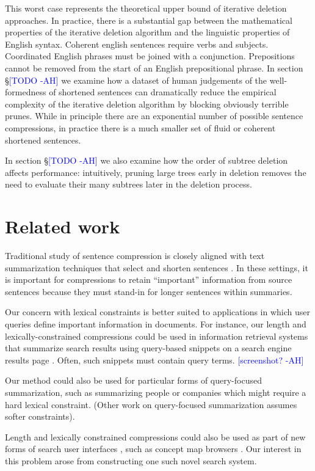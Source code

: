 \documentclass[11pt,a4paper]{article}
\newcommand{\ahcomment}[1]{\textcolor{blue}{[#1 -AH]}}
\begin{document}
This worst case represents the theoretical upper bound of iterative deletion approaches. In practice, there is a substantial gap between the mathematical properties of the iterative deletion algorithm and the linguistic properties of English syntax. Coherent english sentences require verbs and subjects. Coordinated English phrases must be joined with a conjunction. Prepositions cannot be removed from the start of an English prepositional phrase. In section \S\ahcomment{TODO} we examine how a dataset of human judgements of the well-formedness of shortened sentences can dramatically reduce the empirical complexity of the iterative deletion algorithm by blocking obviously terrible prunes. While in principle there are an exponential number of possible sentence compressions, in practice there is a much smaller set of fluid or coherent shortened sentences. 

In section \S\ahcomment{TODO} we also examine how the order of subtree deletion affects performance: intuitively, pruning large trees early in deletion removes the need to evaluate their many subtrees later in the deletion process.



\section{Related work}

Traditional study of sentence compression is closely aligned with text summarization techniques that select and  shorten sentences \cite{Knight2000StatisticsBasedS,vanderwende2007beyond,clarke2008global,Nenkova2012ASO}. 
In these settings, it is important for compressions to retain ``important'' information from source sentences because they must stand-in for longer sentences within summaries.

Our concern with lexical constraints is better suited to applications in which user queries define important information in documents. For instance, our length and lexically-constrained compressions could be used in information retrieval systems that summarize search results using query-based snippets on a search engine results page \cite{tombros1998advantages,Metzler2008MachineLS}. Often, such snippets must contain query terms. \ahcomment{screenshot?}

Our method could also be used for particular forms of query-focused summarization, such as summarizing people \cite{w04} or companies \cite{filippova2009company} which might require a hard lexical constraint. (Other work on query-focused summarization \cite{das} assumes softer constraints). 

Length and lexically constrained compressions could also be used as part of new forms of search user interfaces \cite{hearst2009search}, such as concept map browsers \cite{falke2017graphdocexplore}. Our interest in this problem arose from constructing one such novel search system.



\end{document}
